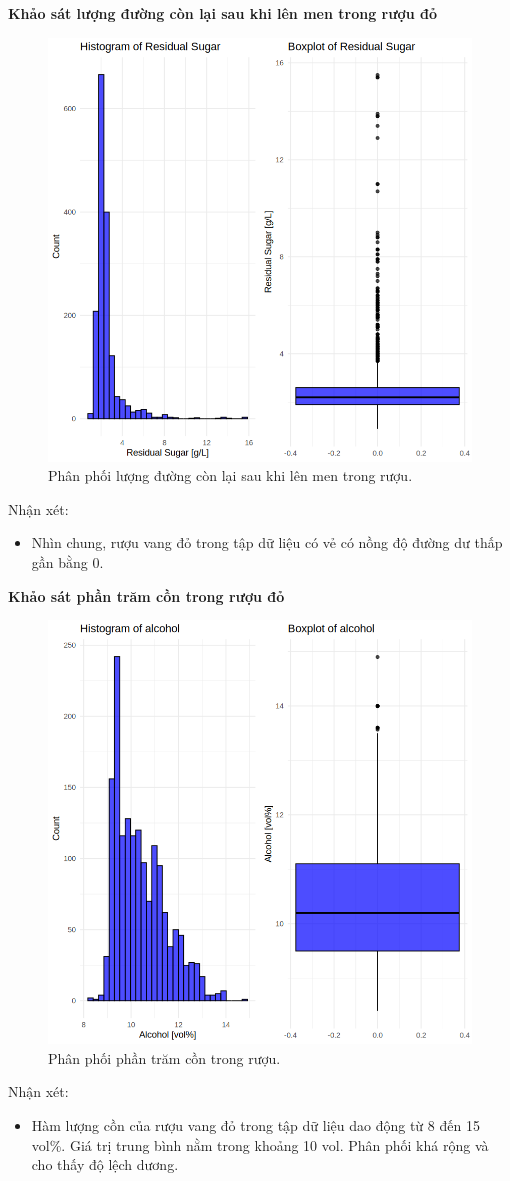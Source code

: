 \textbf{Khảo sát lượng đường còn lại sau khi lên men trong rượu đỏ}
\begin{figure}[H]
    \centering
    \includegraphics[width=0.75\columnwidth]{wine_figures/red_sugar.png}
    \caption{Phân phối lượng đường còn lại sau khi lên men trong rượu.}
    \label{fig:red_sugar}
\end{figure}
Nhận xét:
\begin{itemize}
    \item Nhìn chung, rượu vang đỏ trong tập dữ liệu có vẻ có nồng độ đường dư thấp gần bằng 0. 
\end{itemize}

\textbf{Khảo sát phần trăm cồn trong rượu đỏ}
\begin{figure}[H]
    \centering
    \includegraphics[width=0.75\columnwidth]{wine_figures/red_alcohol.png}
    \caption{Phân phối phần trăm cồn trong rượu.}
    \label{fig:red_alcohol}
\end{figure}
Nhận xét:
\begin{itemize}
    \item Hàm lượng cồn của rượu vang đỏ trong tập dữ liệu dao động từ 8 đến 15 vol\%. Giá trị trung bình nằm trong khoảng 10 vol. Phân phối khá rộng và cho thấy độ lệch dương.
\end{itemize}


